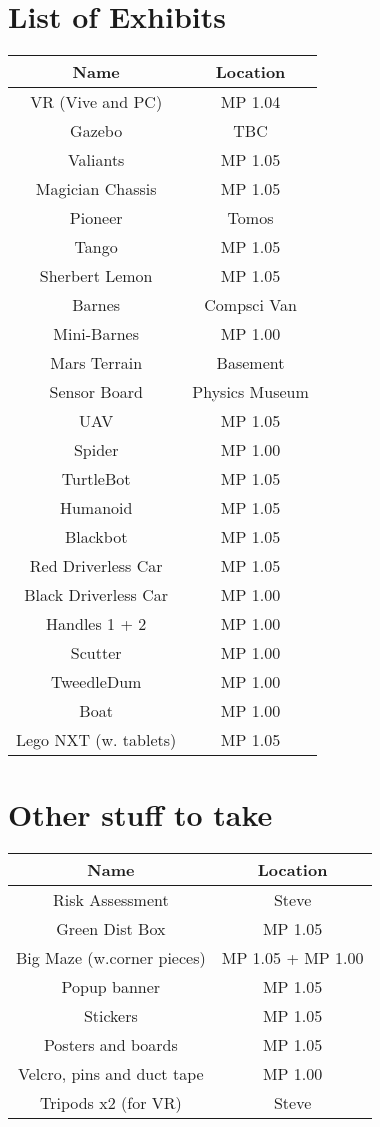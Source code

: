 \documentclass[a4paper]{article}
\begin{document}
\newpage
\section*{List of Exhibits}
\begin{center}
\begin{tabular}{ |c|c| } 
\hline
Name & Location \\
\hline
\hline
VR (Vive and PC) & MP 1.04 \\ 
\hline
Gazebo & TBC \\
\hline
Valiants & MP 1.05 \\
\hline
Magician Chassis & MP 1.05 \\
\hline
Pioneer & Tomos \\
\hline
Tango & MP 1.05 \\
\hline
Sherbert Lemon & MP 1.05 \\
\hline
Barnes & Compsci Van \\
\hline
Mini-Barnes & MP 1.00 \\
\hline
Mars Terrain & Basement \\
\hline
Sensor Board & Physics Museum \\
\hline
UAV & MP 1.05 \\
\hline
Spider & MP 1.00 \\
\hline
TurtleBot & MP 1.05 \\
\hline
Humanoid & MP 1.05 \\
\hline
Blackbot & MP 1.05 \\
\hline
Red Driverless Car & MP 1.05 \\
\hline
Black Driverless Car & MP 1.00 \\
\hline
Handles 1 + 2 & MP 1.00 \\
\hline
Scutter & MP 1.00 \\
\hline 
TweedleDum & MP 1.00 \\
\hline
Boat & MP 1.00 \\
\hline
Lego NXT (w. tablets) & MP 1.05 \\
\hline
\end{tabular}
\end{center}

\section*{Other stuff to take}
\begin{center}
\begin{tabular}{ |c|c| } 
\hline
Name & Location \\
\hline
\hline
Risk Assessment & Steve \\ 
\hline
Green Dist Box & MP 1.05 \\ 
\hline
Big Maze (w.corner pieces) & MP 1.05 + MP 1.00 \\ 
\hline
Popup banner & MP 1.05 \\
\hline
Stickers & MP 1.05 \\
\hline
Posters and boards & MP 1.05 \\
\hline
Velcro, pins and duct tape & MP 1.00 \\
\hline
Tripods x2 (for VR) & Steve \\
\hline 
\end{tabular}
\end{center}
\end{document}
